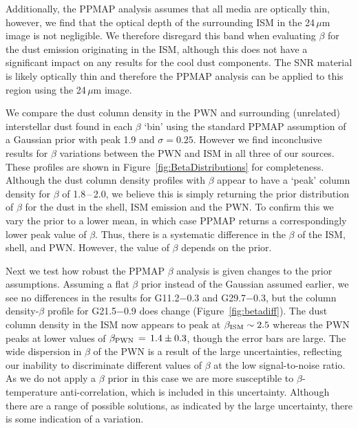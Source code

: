\documentclass[fleqn,usenatbib]{mnras}
\begin{document}
{{Additionally, the PPMAP analysis assumes that all media are optically thin, however, we find that the optical depth of the surrounding ISM in the 24\,$\mu$m image is not negligible. We therefore disregard this band when evaluating $\beta$ for the dust emission originating in the ISM, although this does not have a significant impact on any results for the cool dust components. The SNR material is likely optically thin and therefore the PPMAP analysis can be applied to this region using the 24\,$\mu$m image.

We compare the dust column density in the PWN and surrounding (unrelated) interstellar dust found in each $\beta$ `bin' using the standard PPMAP assumption of a Gaussian prior with peak 1.9 and $\sigma =0.25$. However we find inconclusive results for $\beta$ variations between the PWN and ISM in all three of our sources. These profiles are shown in Figure~\ref{fig:BetaDistributions} for completeness. Although the dust column density profiles with $\beta$ appear to have a `peak' column density for $\beta$ of 1.8\,--\,2.0, we believe this is simply returning the prior distribution of $\beta$ for the dust in the shell, ISM emission and the PWN. To confirm this we vary the prior to a lower mean, in which case PPMAP returns a correspondingly lower peak value of $\beta$. Thus, there is a systematic difference in the $\beta$ of the ISM, shell, and PWN. However, the value of $\beta$ depends on the prior.

Next we test how robust the PPMAP $\beta$ analysis is given changes to the prior assumptions.  Assuming a flat $\beta$ prior instead of the Gaussian assumed earlier, we see no differences in the results for G11.2$-$0.3 and G29.7$-$0.3, but the column density-$\beta$ profile for G21.5$-$0.9 does change (Figure~\ref{fig:betadiff}). The dust column density in the ISM now appears to peak at $\beta_{\rm ISM} \sim 2.5$ whereas the PWN peaks at lower values of $\beta_{\rm PWN}\,=\,1.4 \pm 0.3$, though the error bars are large.
The wide dispersion in $\beta$ of the PWN is a result of the large uncertainties, reflecting our inability to discriminate different values of $\beta$ at the low signal-to-noise ratio.
As we do not apply a $\beta$ prior in this case we are more susceptible to $\beta$-temperature anti-correlation, which is included in this uncertainty. Although there are a range of possible solutions, as indicated by the large uncertainty, there is some indication of a variation.



}}
\end{document}
